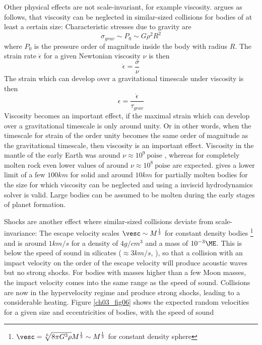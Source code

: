 Other physical effects are not scale-invariant, for example viscosity. \cite{Asphaug:2010p3539} argues as follows, that viscosity can be neglected in similar-sized collisions for bodies of at least a certain size: Characteristic stresses due to gravity are 
\begin{equation}
\sigma_{grav} \sim P_0 \sim G \rho^2 R^2
\end{equation}
where $P_0$ is the pressure order of magnitude inside the body with radius $R$. The strain rate $\dot{\epsilon}$ for a given Newtonian viscosity $\nu$ is then
\begin{equation}
\dot{\epsilon} = \frac{\sigma}{\nu}
\end{equation}
The strain which can develop over a gravitational timescale under viscosity is then
\begin{equation}
\epsilon = \frac{\dot{\epsilon}}{\tau_{grav}}
\end{equation}
Viscosity becomes an important effect, if the maximal strain which can develop over a gravitational timescale is only around unity. Or in other words, when the timescale for strain of the order unity becomes the same order of magnitude as the gravitational timescale, then viscosity is an important effect. Viscosity in the mantle of the early Earth was around $\nu \approx 10^9~\textrm{poise}$ \citep{2004Tectp.384...55W}, whereas for completely molten rock even lower values of around $\nu \approx 10^8~\textrm{poise}$ are expected. \cite{Asphaug:2010p3539} gives a lower limit of a few $100km$ for solid and around $10km$ for partially molten bodies for the size for which viscosity can be neglected and using a inviscid hydrodynamics solver is valid. Large bodies can be assumed to be molten during the early stages of planet formation.

Shocks are another effect where similar-sized collisions deviate from scale-invariance: The escape velocity scales $\vesc \sim M^\frac{1}{3}$ for constant density bodies \footnote{$\vesc = \sqrt[6]{8 \pi G^3 \rho} M^\frac{1}{3} \sim M^\frac{1}{3}$ for constant density sphere} and is around $1km/s$ for a density of $4g/cm^3$ and a mass of $10^{-3} \ME$. This is below the speed of sound in silicates ($\approx 3 km/s$, \cite{Melosh:2007p3502}), so that a collision with an impact velocity on the order of the escape velocity will produce acoustic waves but no strong shocks. For bodies with masses higher than a few Moon masses, the impact velocity comes into the same range as the speed of sound. Collisions are now in the hypervelocity regime and produce strong shocks, leading to a considerable heating. Figure \ref{ch03_fig06} shows the expected random velocities for a given size and eccentricities of bodies, with the speed of sound 

